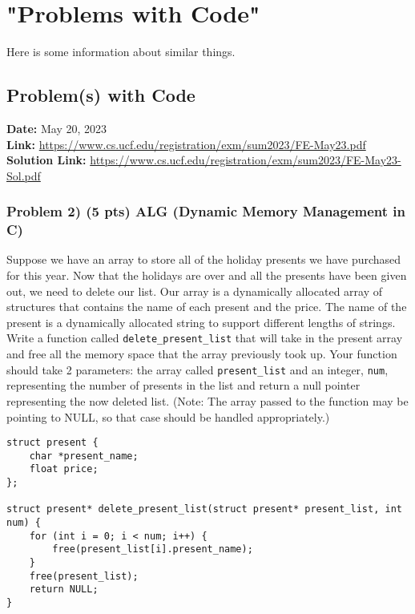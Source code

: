 \documentclass{article}
\begin{document}
\newpage

\section{"Problems with Code"}
Here is some information about similar things.

\subsection{Problem(s) with Code}

\textbf{Date:} May 20, 2023 \\

\textbf{Link:} \url{https://www.cs.ucf.edu/registration/exm/sum2023/FE-May23.pdf} \\

\textbf{Solution Link:} \url{https://www.cs.ucf.edu/registration/exm/sum2023/FE-May23-Sol.pdf} \\

\subsubsection*{Problem 2) (5 pts) ALG (Dynamic Memory Management in C)}

Suppose we have an array to store all of the holiday presents we have purchased for this year. Now that the holidays are over and all the presents have been given out, we need to delete our list. Our array is a dynamically allocated array of structures that contains the name of each present and the price. The name of the present is a dynamically allocated string to support different lengths of strings. Write a function called \texttt{delete\_present\_list} that will take in the present array and free all the memory space that the array previously took up. Your function should take 2 parameters: the array called \texttt{present\_list} and an integer, \texttt{num}, representing the number of presents in the list and return a null pointer representing the now deleted list. (Note: The array passed to the function may be pointing to NULL, so that case should be handled appropriately.)

\begin{verbatim}
struct present {
    char *present_name;
    float price;
}; 

struct present* delete_present_list(struct present* present_list, int num) {
    for (int i = 0; i < num; i++) {
        free(present_list[i].present_name);
    }
    free(present_list);
    return NULL;
}
\end{verbatim}
\end{document}
